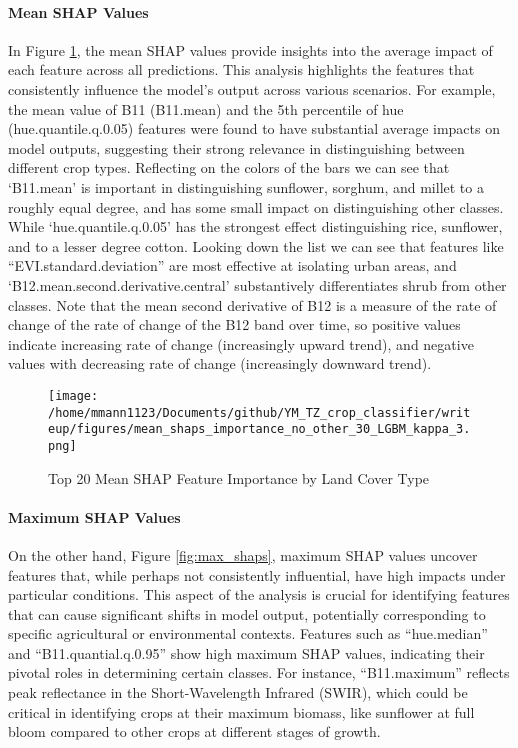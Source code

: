 \documentclass[
  journal,
  twocolumn]{IEEEtran}
\begin{document}
\hypertarget{mean-shap-values}{%
\paragraph{Mean SHAP Values}\label{mean-shap-values}}

In Figure \ref{fig:mean_shaps}, the mean SHAP values provide insights
into the average impact of each feature across all predictions. This
analysis highlights the features that consistently influence the model's
output across various scenarios. For example, the mean value of B11
(B11.mean) and the 5th percentile of hue (hue.quantile.q.0.05) features
were found to have substantial average impacts on model outputs,
suggesting their strong relevance in distinguishing between different
crop types. Reflecting on the colors of the bars we can see that
`B11.mean' is important in distinguishing sunflower, sorghum, and millet
to a roughly equal degree, and has some small impact on distinguishing
other classes. While `hue.quantile.q.0.05' has the strongest effect
distinguishing rice, sunflower, and to a lesser degree cotton. Looking
down the list we can see that features like ``EVI.standard.deviation''
are most effective at isolating urban areas, and
`B12.mean.second.derivative.central' substantively differentiates shrub
from other classes. Note that the mean second derivative of B12 is a
measure of the rate of change of the rate of change of the B12 band over
time, so positive values indicate increasing rate of change
(increasingly upward trend), and negative values with decreasing rate of
change (increasingly downward trend).

\begin{figure}[H]
    \centering
    \texttt{[image: /home/mmann1123/Documents/github/YM\_TZ\_crop\_classifier/writeup/figures/mean\_shaps\_importance\_no\_other\_30\_LGBM\_kappa\_3.png]} %
    \caption{Top 20 Mean SHAP Feature Importance by Land Cover Type}
    \label{fig:mean_shaps} %
\end{figure}

\hypertarget{maximum-shap-values}{%
\paragraph{Maximum SHAP Values}\label{maximum-shap-values}}

On the other hand, Figure \ref{fig:max_shaps}, maximum SHAP values
uncover features that, while perhaps not consistently influential, have
high impacts under particular conditions. This aspect of the analysis is
crucial for identifying features that can cause significant shifts in
model output, potentially corresponding to specific agricultural or
environmental contexts. Features such as ``hue.median'' and
``B11.quantial.q.0.95'' show high maximum SHAP values, indicating their
pivotal roles in determining certain classes. For instance,
``B11.maximum'' reflects peak reflectance in the Short-Wavelength
Infrared (SWIR), which could be critical in identifying crops at their
maximum biomass, like sunflower at full bloom compared to other crops at
different stages of growth.
\end{document}
